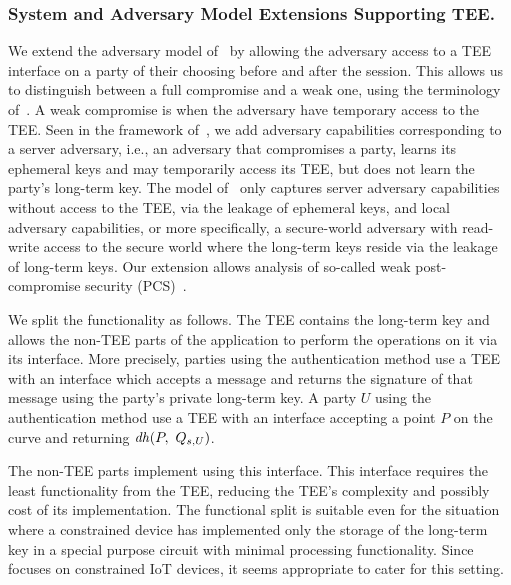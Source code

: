 \subsubsection{System and Adversary Model Extensions Supporting TEE.}
\label{sec:TEE:advModel}
%
We extend the adversary model of~\cite{Norr21} by allowing the adversary
access to a TEE interface on a party of their choosing before and after the
\mEdhoc{} session.
%
This allows us to distinguish between a full compromise and a weak one, using
the terminology of~\cite{DBLP:conf/csfw/Cohn-GordonCG16}.
%
A weak compromise is when the adversary have temporary access to the TEE.
%
Seen in the framework of~\cite{DBLP:conf/icics/XuZRWTZ20}, we add adversary
capabilities corresponding to a server adversary, i.e., an adversary that
compromises a party, learns its ephemeral keys and may temporarily access its
TEE, but does not learn the party's long-term key.
%
The model of~\cite{Norr21} only captures server adversary capabilities without
access to the TEE, via the leakage of ephemeral keys, and local adversary
capabilities, or more specifically, a secure-world adversary with read-write
access to the
secure world where the long-term keys reside via the leakage of long-term keys.
%
Our extension allows analysis of so-called weak post-compromise security
(PCS)~\cite{DBLP:conf/csfw/Cohn-GordonCG16}.
%

We split the \mEdhoc{} functionality as follows.
%
The TEE contains the long-term key and allows the non-TEE parts of the
application to perform the operations on it via its interface.
%
More precisely, parties using the \mSig{} authentication method use a TEE with
an interface which accepts a message and returns the signature of that message
using the party's private long-term key.
%
A party $U$ using the \mStat{} authentication method use a TEE with an interface
accepting a point $P$ on the curve and returning $\mDH(P,\ \mGu{})$.
%

The non-TEE parts implement \mEdhoc{} using this interface.
%
This interface requires the least functionality from the TEE, reducing the TEE's
complexity and possibly cost of its implementation.
%
The functional split is suitable even for the situation where a
constrained device has implemented only the storage of the long-term key in a
special purpose circuit with minimal processing functionality.
%
Since \mEdhoc{} focuses on constrained IoT devices, it seems appropriate to
cater for this setting.
%

